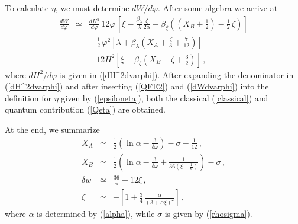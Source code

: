 To calculate $\eta$, we must determine ${dW}/{d\varphi}$.
After some algebra we arrive at
\begin{eqnarray}
\frac{dW}{d\varphi}&\simeq&\frac{dH^2}{d\varphi}\,12\varphi\,\left[\xi
-\frac{\beta_{\lambda}}{\lambda}\frac{\zeta}{2\alpha}
+ \beta_{\xi}\left((X_B+\frac12)-\frac12\,\zeta\right)\right]\nonumber\\
&&+\,\frac12\,\varphi^2\left[\lambda+\beta_{\lambda}\left(X_A +
\frac{\zeta}{3}+\frac{7}{12} \right)\right]\nonumber\\
&&
+\,12H^2\left[\xi+\beta_{\xi}\left(X_B+\zeta+\frac32\right)\right]\,,\label{dWdvarphi}
\end{eqnarray}
where ${dH^2}/{d\varphi}$ is given in (\ref{dH^2dvarphi}).
After expanding the denominator in (\ref{dH^2dvarphi}) and after
inserting (\ref{QFE2}) and (\ref{dWdvarphi}) into the definition
for $\eta$ given by (\ref{epsiloneta}), both the classical
(\ref{classical}) and quantum contribution (\ref{Qeta}) are obtained.

At the end, we summarize
\begin{eqnarray}
X_A &\simeq& \frac12\left(\ln\alpha -\frac{3}{\delta\omega}\right)
-\sigma-\frac{1}{12}
\,,\nonumber\\
X_B &\simeq& \frac12\left(\ln\alpha
-\frac{3}{\delta\omega}+\frac{1}{36\left(\xi-\frac16\right)}\right)-\sigma\,,\nonumber\\
\delta w &\simeq& \frac{36}{\alpha} + 12\xi\,,\nonumber\\
\zeta &\simeq&
-\left[1+\frac34\,\frac{\alpha}{(3+\alpha\xi)^2}\right]\,,
\end{eqnarray}
where $\alpha$ is determined by (\ref{alpha}), while
$\sigma$ is given by (\ref{rhosigma}).

